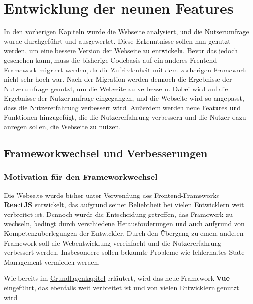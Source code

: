 
\chapter{Entwicklung der neunen Features}
\label{chapter:6}


In den vorherigen Kapiteln wurde die Webseite analysiert, und die Nutzerumfrage wurde durchgeführt und ausgewertet. Diese Erkenntnisse sollen nun genutzt werden, um eine bessere Version der Webseite zu entwickeln. Bevor das jedoch geschehen kann, muss die bisherige Codebasis auf ein anderes Frontend-Framework migriert werden, da die Zufriedenheit mit dem vorherigen Framework nicht sehr hoch war. Nach der Migration werden dennoch die Ergebnisse der Nutzerumfrage genutzt, um die Webseite zu verbessern. Dabei wird auf die Ergebnisse der Nutzerumfrage eingegangen, und die Webseite wird so angepasst, dass die Nutzererfahrung verbessert wird. Außerdem werden neue Features und Funktionen hinzugefügt, die die Nutzererfahrung verbessern und die Nutzer dazu anregen sollen, die Webseite zu nutzen.

\section{Frameworkwechsel und Verbesserungen}

\subsection{Motivation für den Frameworkwechsel}

Die Webseite wurde bisher unter Verwendung des Frontend-Frameworks \textbf{ReactJS} entwickelt, das aufgrund seiner Beliebtheit bei vielen Entwicklern weit verbreitet ist. Dennoch wurde die Entscheidung getroffen, das Framework zu wechseln, bedingt durch verschiedene Herausforderungen und auch aufgrund von Kompetenzüberlegungen der Entwickler. Durch den Übergang zu einem anderen Framework soll die Webentwicklung vereinfacht und die Nutzererfahrung verbessert werden. Insbesondere sollen bekannte Probleme wie fehlerhaftes State Management vermieden werden.

Wie bereits im \hyperref[chapter:3-frontend-frameworks]{Grundlagenkapitel} erläutert, wird das neue Framework \textbf{Vue} eingeführt, das ebenfalls weit verbreitet ist und von vielen Entwicklern genutzt wird.

